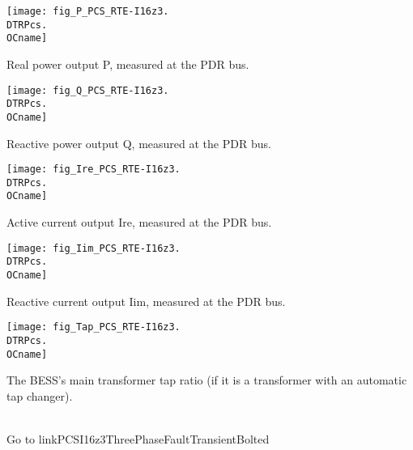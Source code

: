     \vspace{0.5cm}
    \begin{minipage}[t]{0.48\textwidth}
        \centering
        \texttt{[image: fig\_P\_PCS\_RTE-I16z3.\\DTRPcs.\\OCname]}
        \begin{minipage}[t]{0.8\textwidth}
            \small Real power output P, measured at the PDR bus.
        \end{minipage}
    \end{minipage}
    \hfill
    \begin{minipage}[t]{0.48\textwidth}
        \centering
        \texttt{[image: fig\_Q\_PCS\_RTE-I16z3.\\DTRPcs.\\OCname]}
        \begin{minipage}[t]{0.8\textwidth}
            \small Reactive power output Q, measured at the PDR bus.
        \end{minipage}
    \end{minipage}

    \vspace{0.5cm}
    \begin{minipage}[t]{0.48\textwidth}
        \centering
        \texttt{[image: fig\_Ire\_PCS\_RTE-I16z3.\\DTRPcs.\\OCname]}
        \begin{minipage}[t]{0.8\textwidth}
            \small Active current output Ire, measured at the PDR bus.
        \end{minipage}
    \end{minipage}
    \hfill
    \begin{minipage}[t]{0.48\textwidth}
        \centering
        \texttt{[image: fig\_Iim\_PCS\_RTE-I16z3.\\DTRPcs.\\OCname]}
        \begin{minipage}[t]{0.8\textwidth}
            \small Reactive current output Iim, measured at the PDR bus.
        \end{minipage}
    \end{minipage}

    \vspace{0.5cm}
    \begin{minipage}[t]{0.48\textwidth}
        \centering
        \texttt{[image: fig\_Tap\_PCS\_RTE-I16z3.\\DTRPcs.\\OCname]}
        \begin{minipage}[t]{0.8\textwidth}
            \small The BESS's main transformer tap ratio (if it is a transformer with an
            automatic tap changer).
        \end{minipage}
    \end{minipage}
    \\[2\baselineskip]
    Go to  {{ linkPCSI16z3ThreePhaseFaultTransientBolted }}

